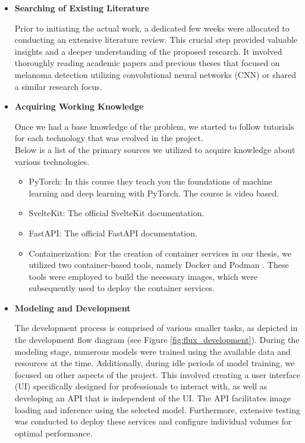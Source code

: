 \begin{itemize}
  \item{\textbf{Searching of Existing Literature}}

    Prior to initiating the actual work, a dedicated few weeks were allocated
    to conducting an extensive literature review. This crucial step provided
    valuable insights and a deeper understanding of the proposed research. It
    involved thoroughly reading academic papers and previous theses that
    focused on melanoma detection utilizing convolutional neural networks (CNN)
    or shared a similar research focus.

  \item{\textbf{Acquiring Working Knowledge}}

    Once we had a base knowledge of the problem, we started to follow tutorials
    for each technology that was evolved in the project. \\

    Below is a list of the primary sources we utilized to acquire knowledge
    about various technologies.

    \begin{itemize}

      \item PyTorch: \cite{LearnPyTorch} In this course they teach you the
        foundations of machine learning and deep learning with PyTorch. The
        course is video based.

      \item SvelteKit: \cite{LearnSvelteKit} The official SvelteKit
        documentation.

      \item FastAPI: \cite{LearnFastAPI} The official FastAPI documentation.

      \item Containerization: For the creation of container services in our thesis, we
        utilized two container-based tools, namely Docker \cite{LearnDocker} and
        Podman \cite{LearnPodman}. These tools were employed to build the
        necessary images, which were subsequently used to deploy the container
        services.

    \end{itemize}

  \item{\textbf{Modeling and Development}}

    The development process is comprised of various smaller tasks, as depicted
    in the development flow diagram (see Figure \ref{fig:flux_development}).
    During the modeling stage, numerous models were trained using the available
    data and resources at the time. Additionally, during idle periods of model
    training, we focused on other aspects of the project. This involved
    creating a user interface (UI) specifically designed for professionals to
    interact with, as well as developing an API that is independent of the UI.
    The API facilitates image loading and inference using the selected model.
    Furthermore, extensive testing was conducted to deploy these services and
    configure individual volumes for optimal performance.


\end{itemize}
